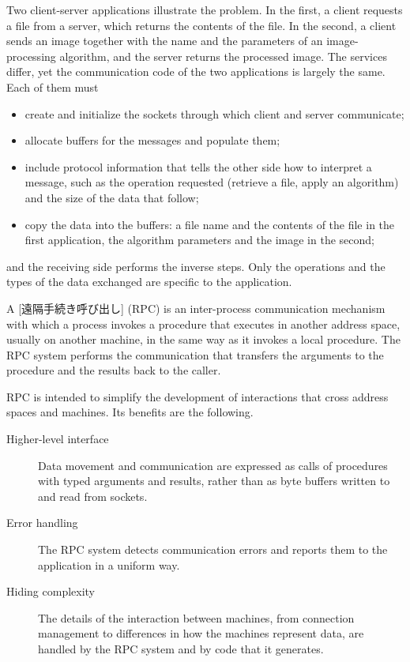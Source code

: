 \documentclass[../main.tex]{subfiles}
\begin{document}
Two client-server applications illustrate the problem.  In the first, a
client requests a file from a server, which returns the contents of the
file.  In the second, a client sends an image together with the name and
the parameters of an image-processing algorithm, and the server returns the
processed image.  The services differ, yet the communication code of the
two applications is largely the same.  Each of them must
\begin{itemize}
  \item create and initialize the sockets through which client and server
    communicate;
  \item allocate buffers for the messages and populate them;
  \item include protocol information that tells the other side how to
    interpret a message, such as the operation requested (retrieve a file,
    apply an algorithm) and the size of the data that follow;
  \item copy the data into the buffers: a file name and the contents of the
    file in the first application, the algorithm parameters and the image
    in the second;
\end{itemize}
and the receiving side performs the inverse steps.  Only the operations and
the types of the data exchanged are specific to the application.

\begin{definition}
  A [遠隔手続き呼び出し] (RPC) is an
  inter-process communication mechanism with which a process invokes a
  procedure that executes in another address space, usually on another
  machine, in the same way as it invokes a local procedure.  The RPC system
  performs the communication that transfers the arguments to the procedure
  and the results back to the caller.
\end{definition}

RPC is intended to simplify the development of interactions that cross
address spaces and machines.  Its benefits are the following.
\begin{description}
  \item[Higher-level interface] Data movement and communication are
    expressed as calls of procedures with typed arguments and results,
    rather than as byte buffers written to and read from sockets.
  \item[Error handling] The RPC system detects communication errors and
    reports them to the application in a uniform way.
  \item[Hiding complexity] The details of the interaction between machines,
    from connection management to differences in how the machines represent
    data, are handled by the RPC system and by code that it generates.
\end{description}
\end{document}
